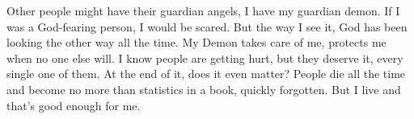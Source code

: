 \documentclass[12pt,letterpaper]{article}
\begin{document}
Other people might have their guardian angels, I have my guardian demon. If I was a God-fearing person, I would be scared. But the way I see it, God has been looking the other way all the time. My Demon takes care of me, protects me when no one else will. I know people are getting hurt, but they deserve it, every single one of them. At the end of it, does it even matter? People die all the time and become no more than statistics in a book, quickly forgotten. But I live and that's good enough for me.

\end{document}
